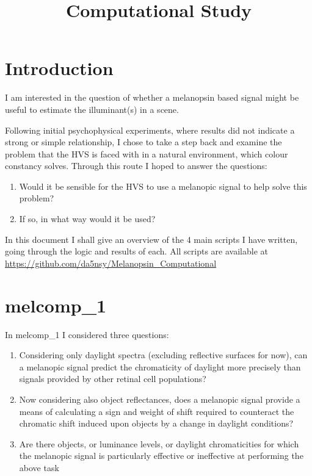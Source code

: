 \documentclass{article}
\title{Computational Study}
\author{}
\date{}
\begin{document}
\maketitle

\section{Introduction}

I am interested in the question of whether a melanopsin based signal might be useful to estimate the illuminant(s) in a scene.

Following initial psychophysical experiments, where results did not indicate a strong or simple relationship, I chose to take a step back and examine the problem that the HVS is faced with in a natural environment, which colour constancy solves. Through this route I hoped to answer the questions:
\begin{enumerate}
	\item Would it be sensible for the HVS to use a melanopic signal to help solve this problem?
	\item If so, in what way would it be used?
\end{enumerate}

In this document I shall give an overview of the 4 main scripts I have written, going through the logic and results of each.
All scripts are available at \url{https://github.com/da5nsy/Melanopsin_Computational}

\section{melcomp\_1}

In melcomp\_1 I considered three questions:
\begin{enumerate}
\item Considering only daylight spectra (excluding reflective surfaces for now), can a melanopic signal predict the chromaticity of daylight more precisely than signals provided by other retinal cell populations?
\item Now considering also object reflectances, does a melanopic signal provide a means of calculating a sign and weight of shift required to counteract the chromatic shift induced upon objects by a change in daylight conditions?
\item Are there objects, or luminance levels, or daylight chromaticities for which the melanopic signal is particularly effective or ineffective at performing the above task
\end{enumerate}
\end{document}
